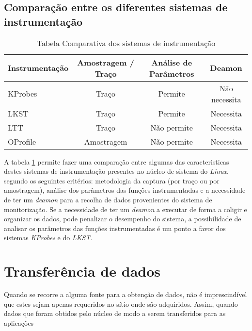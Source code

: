 \subsection{Comparação entre os diferentes sistemas de instrumentação}
\begin{table}[h!]
\begin{center}
\caption{Tabela Comparativa dos sistemas de instrumentação}
\label{tab:inst_compare}
\begin{tabular}{|l||c|c|c|}
\hline
Instrumentação & Amostragem / Traço & Análise de Parâmetros & Deamon \\
\hline
KProbes & Traço & Permite & Não necessita \\
\hline
LKST & Traço & Permite & Necessita \\
\hline
LTT & Traço & Não permite & Necessita \\
\hline
OProfile & Amostragem & Não permite & Necessita \\
\hline

\end{tabular}
\end{center}
\end{table}


A tabela \ref{tab:inst_compare} permite fazer uma comparação entre algumas das caracteristicas destes sistemas de instrumentação presentes no núcleo de sistema do \textit{Linux}, segundo os seguintes critérios: metodologia da captura (por traço ou por amostragem), análise dos parâmetros das funções instrumentadas e a necessidade de ter um \textit{deamon} para a recolha de dados provenientes do sistema de monitorização.
Se a necessidade de ter um \textit{deamon} a executar de forma a coligir e organizar os dados, pode penalizar o desempenho do sistema, a possibilidade de analisar os parâmetros das funções instrumentadas é um ponto a favor dos sistemas \textit{KProbes} e do \textit{LKST}.



\section{Transferência de dados}
\label{sect:kernel_user_comm}


Quando se recorre a alguma fonte para a obtenção de dados, não é imprescindível que estes sejam apenas requeridos no sítio onde são adquiridos.
Assim, quando dados que foram obtidos pelo núcleo de modo a serem transferidos para as aplicações 


